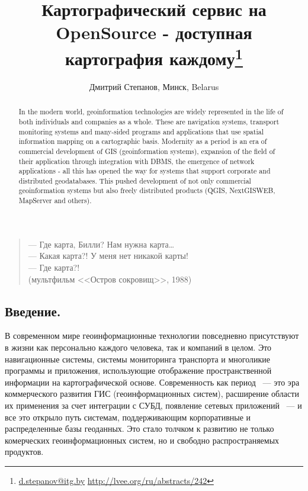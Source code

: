 \documentclass[10pt, a5paper]{article}
\begin{document}
\title{Картографический сервис на OpenSource - доступная картография каждому\footnote{\url{d.stepanov@itg.by} \url{http://lvee.org/ru/abstracts/242}}}
\author{Дмитрий Степанов, Минск, Belarus}
\maketitle
\begin{abstract}
In the modern world, geoinformation technologies are widely represented in the life of both individuals and companies as a whole. These are navigation systems, transport monitoring systems and many-sided programs and applications that use spatial information mapping on a cartographic basis. Modernity as a period is an era of commercial development of GIS \linebreak(geoinformation systems), expansion of the field of their application through integration with DBMS, the emergence of network applications - all this has opened the way for systems that support corporate and distributed geodatabases. This pushed development of not only commercial geoinformation systems but also freely \linebreak distributed products (QGIS, NextGISWEB, MapServer and others).
\end{abstract}
\begin{flushleft}
\begin{verse}
— Где карта, Билли? Нам нужна карта\ldots{} \\
— Какая карта?! У меня нет никакой карты!\\
— Где карта?!\\
(мультфильм <<Остров сокровищ>>, 1988)
\end{verse}
\end{flushleft}
\subsection*{Введение.}

В современном мире геоинформационные технологии повседневно присутствуют в жизни как персонально каждого человека, так и компаний в целом. Это навигационные системы, системы мониторинга транспорта и многоликие программы и приложения, использующие отображение пространственной информации на картографической основе. 
Современность как период ~--- это эра коммерческого развития ГИС (геоинформационных систем), расширение области их применения за счет интеграции с СУБД, появление сетевых приложений ~--- и все это открыло путь системам, поддерживающим корпоративные и распределенные базы геоданных.  Это стало толчком к развитию не только комерческих геоинформационных систем, но и свободно распространяемых продуктов.
\end{document}
